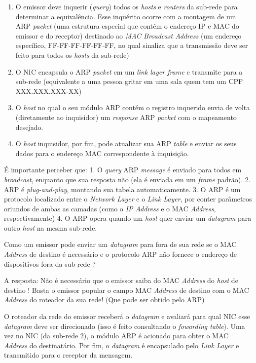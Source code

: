 \begin{enumerate}
\def\labelenumi{\arabic{enumi}.}
\tightlist
\item
  O emissor deve inquerir (\emph{query}) todos os \emph{hosts} e
  \emph{routers} da sub-rede para determinar a equivalência. Esse
  inquérito ocorre com a montagem de um ARP \emph{packet} (uma estrutura
  especial que contém o endereço IP e MAC do emissor e do receptor)
  destinado ao \emph{MAC Broadcast Address} (um endereço específico,
  FF-FF-FF-FF-FF-FF, no qual sinaliza que a transmissão deve ser feito
  para todos os \emph{hosts} da sub-rede)
\item
  O NIC encapsula o ARP \emph{packet} em um \emph{link layer frame} e
  transmite para a sub-rede (equivalente a uma pessoa gritar em uma sala
  quem tem um CPF XXX.XXX.XXX-XX)
\item
  O \emph{host} no qual o seu módulo ARP contém o registro inquerido
  envia de volta (diretamente ao inquisidor) um \emph{response} ARP
  \emph{packet} com o mapeamento desejado.
\item
  O \emph{host} inquisidor, por fim, pode atualizar sua ARP \emph{table}
  e enviar os seus dados para o endereço MAC correspondente à
  inquisição.
\end{enumerate}

É importante perceber que: 1. O \emph{query} ARP \emph{message} é
enviado para todos em \emph{broadcast}, enquanto que sua resposta não
(ela é enviada em um \emph{frame} padrão). 2. ARP é
\emph{plug-and-play}, montando sua tabela automaticamente. 3. O ARP é um
protocolo localizado entre o \emph{Network Layer} e o \emph{Link Layer},
por conter parâmetros oriundos de ambas as camadas (como o \emph{IP
Address} e o MAC \emph{Address}, respectivamente) 4. O ARP opera quando
um \emph{host} quer enviar um \emph{datagram} para outro \emph{host} na
mesma sub-rede.

Como um emissor pode enviar um \emph{datagram} para fora de sua rede se
o MAC \emph{Address} de destino é necessário e o protocolo ARP não
fornece o endereço de dispositivos fora da sub-rede ?

A resposta: Não é necessário que o emissor saiba do MAC \emph{Address} do
\emph{host} de destino ! Basta o emissor popular o campo MAC
\emph{Address} de destino com o MAC \emph{Address} do roteador da sua
rede! (Que pode ser obtido pelo ARP)

O roteador da rede do emissor receberá o \emph{datagram} e avaliará para
qual NIC esse \emph{datagram} deve ser direcionado (isso é feito
consultando o \emph{fowarding table}). Uma vez no NIC (da sub-rede 2), o
módulo ARP é acionado para obter o MAC \emph{Address} do destinatário.
Por fim, o \emph{datagram} é encapsulado pelo \emph{Link Layer} e
transmitido para o receptor da mensagem.

